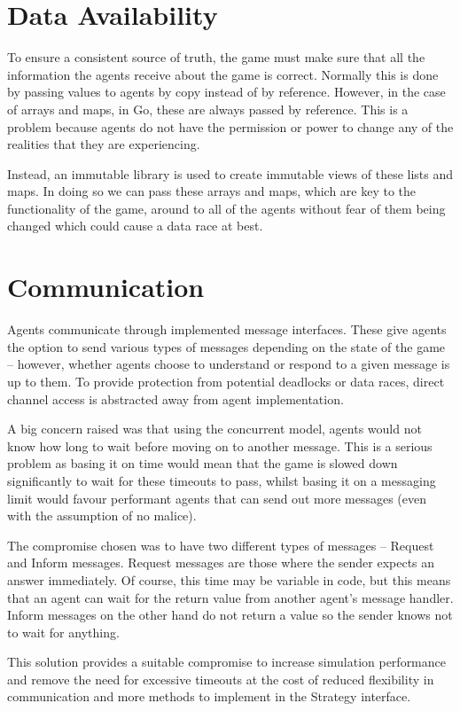 \section{Data Availability}
To ensure a consistent source of truth, the game must make sure that all the information the agents receive about the game is correct. Normally this is done by passing values to agents by copy instead of by reference. However, in the case of arrays and maps, in Go, these are always passed by reference. This is a problem because agents do not have the permission or power to change any of the realities that they are experiencing.

Instead, an immutable library is used to create immutable views of these lists and maps. In doing so we can pass these arrays and maps, which are key to the functionality of the game, around to all of the agents without fear of them being changed which could cause a data race at best.

\section{Communication}
Agents communicate through implemented message interfaces. These give agents the option to send various types of messages depending on the state of the game – however, whether agents choose to understand or respond to a given message is up to them. To provide protection from potential deadlocks or data races, direct channel access is abstracted away from agent implementation.

A big concern raised was that using the concurrent model, agents would not know how long to wait before moving on to another message. This is a serious problem as basing it on time would mean that the game is slowed down significantly to wait for these timeouts to pass, whilst basing it on a messaging limit would favour performant agents that can send out more messages (even with the assumption of no malice).

The compromise chosen was to have two different types of messages – Request and Inform messages. Request messages are those where the sender expects an answer immediately. Of course, this time may be variable in code, but this means that an agent can wait for the return value from another agent’s message handler. Inform messages on the other hand do not return a value so the sender knows not to wait for anything.

This solution provides a suitable compromise to increase simulation performance and remove the need for excessive timeouts at the cost of reduced flexibility in communication and more methods to implement in the Strategy interface.

